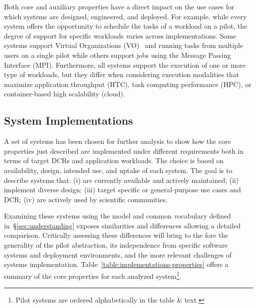 \documentclass{sig-alternate}
\begin{document}
Both core and auxiliary properties have a direct impact on the use cases for
which \pilot systems are designed, engineered, and deployed. For example, while
every \pilot system offers the opportunity to schedule the tasks of a workload
on a pilot, the degree of support for specific workloads varies across
implementations. Some \pilot systems support Virtual Organizations
(VO)~\cite{foster2001} and running tasks from multiple users on a single pilot
while others support jobs using the Message Passing Interface (MPI).
Furthermore, all \pilot systems support the execution of one or more type of
workloads, but they differ when considering execution modalities that maximize
application throughput (HTC), task computing performance (HPC), or
container-based high scalability (cloud).



%
\subsection{\pilot System Implementations}
\label{sec:implementations}

A set of \pilot systems has been chosen for further analysis to show how the
core properties just described are implemented under different requirements both
in terms of target DCRs and application workloads. The choice is based on
availability, design, intended use, and uptake of each \pilot system. The goal
is to describe systems that: (i) are currently available and actively
maintained; (ii) implement diverse design; (iii) target specific or
general-purpose use cases and DCR; (iv) are actively used by scientific
communities.

Examining these \pilot systems using the model and common vocabulary defined
in~\S\ref{sec:understanding} exposes similarities and differences allowing a
detailed comparison. Critically assessing these differences will bring to the
fore the generality of the pilot abstraction, its independence from specific
software systems and deployment environments, and the more relevant challenges
of \pilot systems implementation. Table~\ref{table:implementations-properties}
offers a summary of the core properties for each analyzed \pilot
system\protect\footnote{Pilot systems are ordered alphabetically in the table \&
text.}.
\end{document}
